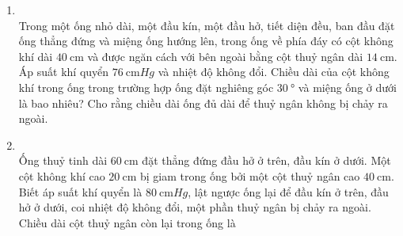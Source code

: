 \begin{enumerate}[label=\bfseries Câu \arabic*:, leftmargin=1.7cm]
\item {}\\
Trong một ống nhỏ dài, một đầu kín, một đầu hở, tiết diện đều, ban đầu đặt ống thẳng đứng và miệng ống hướng lên, trong ống về phía đáy có cột không khí dài $\SI{40}{\centi\meter}$ và được ngăn cách với bên ngoài bằng cột thuỷ ngân dài $\SI{14}{\centi\meter}$. Áp suất khí quyển $\SI{76}{\centi\meter Hg}$ và nhiệt độ không đổi. Chiều dài của cột không khí trong ống trong trường hợp ống đặt nghiêng góc $\SI{30}{\degree}$ và miệng ống ở dưới là bao nhiêu? Cho rằng chiều dài ống đủ dài để thuỷ ngân không bị chảy ra ngoài.

\item {}\\
Ống thuỷ tinh dài $\SI{60}{\centi\meter}$ đặt thẳng đứng đầu hở ở trên, đầu kín ở dưới. Một cột không khí cao $\SI{20}{\centi\meter}$ bị giam trong ống bởi một cột thuỷ ngân cao $\SI{40}{\centi\meter}$. Biết áp suất khí quyển là $\SI{80}{\centi\meter Hg}$, lật ngược ống lại để đầu kín ở trên, đầu hở ở dưới, coi nhiệt độ không đổi, một phần thuỷ ngân bị chảy ra ngoài. Chiều dài cột thuỷ ngân còn lại trong ống là


\end{enumerate}
